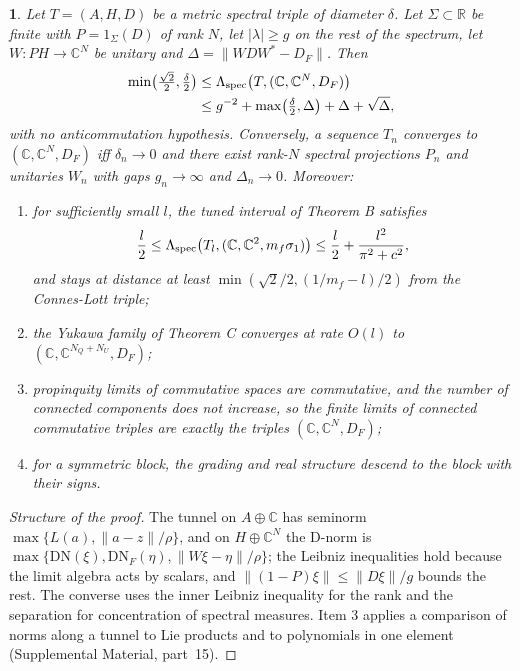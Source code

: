 \documentclass[aps,prd,reprint,onecolumn,nofootinbib,amsmath,amssymb,floatfix]{revtex4-2}
\theoremstyle{plain}
\newcommand{\resultname}{}
\newtheorem*{resultenv}{\resultname}
\newenvironment{result}[1]{\renewcommand{\resultname}{#1}\begin{resultenv}}{\end{resultenv}}
\newcommand{\supp}[1]{Supplemental Material, part~#1}
\newcommand{\Lspec}{\Lambda_{\rm spec}}
\newcommand{\C}{\mathbb C}
\begin{document}
\begin{result}{Proposition G}
Let $T=(A,H,D)$ be a metric spectral triple of diameter $\delta$. Let $\Sigma\subset\mathbb R$ be finite with $P=1_\Sigma(D)$ of rank $N$, let $|\lambda|\ge g$ on the rest of the spectrum, let $W:PH\to\C^N$ be unitary and $\Delta=\|WDW^*-D_F\|$. Then
\begin{equation}
\begin{split}
\min\bigl(\tfrac{\sqrt2}{2},\tfrac\delta2\bigr)&\le\Lspec\bigl(T,(\C,\C^N,D_F)\bigr)\\
&\le g^{-2}+\max\bigl(\tfrac\delta2,\Delta\bigr)+\Delta+\sqrt\Delta,
\end{split}
\end{equation}
with no anticommutation hypothesis. Conversely, a sequence $T_n$ converges to $(\C,\C^N,D_F)$ iff $\delta_n\to0$ and there exist rank-$N$ spectral projections $P_n$ and unitaries $W_n$ with gaps $g_n\to\infty$ and $\Delta_n\to0$. Moreover:
\begin{enumerate}
\item for sufficiently small $l$, the tuned interval of Theorem B satisfies
\begin{equation}
\frac l2\le\Lspec\bigl(T_l,(\C,\C^2,m_f\sigma_1)\bigr)\le\frac l2+\frac{l^2}{\pi^2+c^2},
\end{equation}
and stays at distance at least $\min(\sqrt2/2,(1/m_f-l)/2)$ from the Connes-Lott triple;
\item the Yukawa family of Theorem C converges at rate $O(l)$ to $(\C,\C^{N_Q+N_U},D_F)$;
\item propinquity limits of commutative spaces are commutative, and the number of connected components does not increase, so the finite limits of connected commutative triples are exactly the triples $(\C,\C^N,D_F)$;
\item for a symmetric block, the grading and real structure descend to the block with their signs.
\end{enumerate}
\end{result}

\begin{proof}[Structure of the proof]
The tunnel on $A\oplus\C$ has seminorm $\max\{L(a),\|a-z\|/\rho\}$, and on $H\oplus\C^N$ the D-norm is $\max\{\mathrm{DN}(\xi),\mathrm{DN}_F(\eta),\|W\xi-\eta\|/\rho\}$; the Leibniz inequalities hold because the limit algebra acts by scalars, and $\|(1-P)\xi\|\le\|D\xi\|/g$ bounds the rest. The converse uses the inner Leibniz inequality for the rank and the separation for concentration of spectral measures. Item 3 applies a comparison of norms along a tunnel to Lie products and to polynomials in one element (\supp{15}).
\end{proof}
\end{document}
